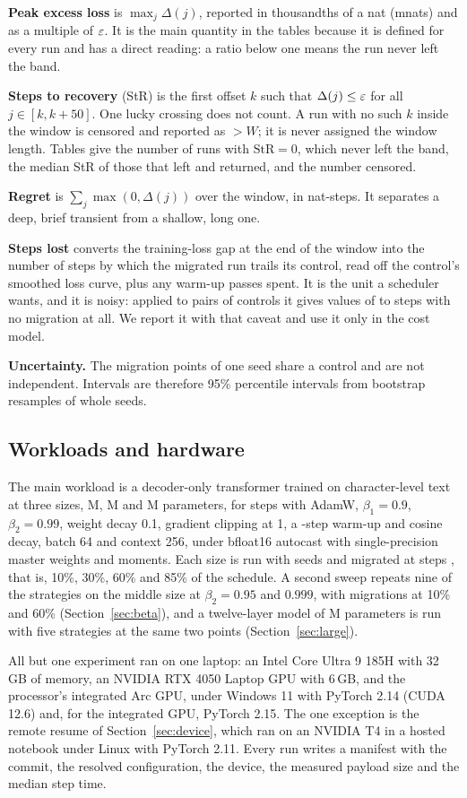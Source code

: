 \textbf{Peak excess loss} is $\max_j \Delta(j)$, reported in thousandths of a nat (mnats) and as a multiple of $\varepsilon$.
It is the main quantity in the tables because it is defined for every run and has a direct reading: a ratio below one
means the run never left the band.

\textbf{Steps to recovery} (StR) is the first offset $k$ such that $\Delta(j) \le \varepsilon$ for all $j \in [k, k+50]$.
One lucky crossing does not count. A run with no such $k$ inside the window is censored and reported as $>W$; it is
never assigned the window length. Tables give the number of runs with $\mathrm{StR} = 0$, which never left the band,
the median StR of those that left and returned, and the number censored.

\textbf{Regret} is $\sum_j \max(0, \Delta(j))$ over the window, in nat-steps. It separates a deep, brief transient from
a shallow, long one.

\textbf{Steps lost} converts the training-loss gap at the end of the window into the number of steps by which the
migrated run trails its control, read off the control's smoothed loss curve, plus any warm-up passes spent. It is the
unit a scheduler wants, and it is noisy: applied to pairs of controls it gives values of \bandLamMin{} to
\bandLamMax{} steps with no migration at all. We report it with that caveat and use it only in the cost model.

\textbf{Uncertainty.} The migration points of one seed share a control and are not independent. Intervals are
therefore 95\% percentile intervals from \bootDraws{} bootstrap resamples of whole seeds.

\subsection{Workloads and hardware}

The main workload is a decoder-only transformer trained on character-level text~\cite{karpathy2022nanogpt} at three
sizes, \paramsXS{}M, \paramsS{}M and \paramsM{}M parameters, for \maxSteps{} steps with AdamW, $\beta_1 = 0.9$,
$\beta_2 = 0.99$, weight decay 0.1, gradient clipping at 1, a \warmupSteps-step warm-up and cosine decay, batch 64 and
context 256, under bfloat16 autocast with single-precision master weights and moments. Each size is run with
\nSeedsMax{} seeds and migrated at steps \forkList{}, that is, 10\%, 30\%, 60\% and 85\% of the schedule. A second sweep repeats nine of the strategies on the middle size at
$\beta_2 = 0.95$ and $0.999$, with migrations at 10\% and 60\% (Section~\ref{sec:beta}), and a twelve-layer model of \largeParams{}M parameters is
run with five strategies at the same two points (Section~\ref{sec:large}).

All but one experiment ran on one laptop: an Intel Core Ultra 9 185H with 32\,GB of memory, an NVIDIA RTX 4050 Laptop GPU with
6\,GB, and the processor's integrated Arc GPU, under Windows 11 with PyTorch 2.14 (CUDA 12.6) and, for the integrated
GPU, PyTorch 2.15. The one exception is the remote resume of Section~\ref{sec:device}, which ran on an NVIDIA T4 in a
hosted notebook under Linux with PyTorch 2.11. Every run writes a manifest with the commit, the resolved configuration, the device, the measured
payload size and the median step time.
